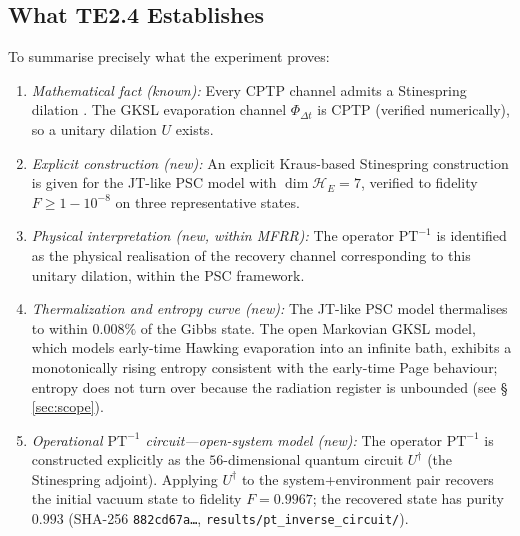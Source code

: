 \documentclass[11pt,twocolumn]{article}
\theoremstyle{remark}
\begin{document}
\subsection{What TE2.4 Establishes}

To summarise precisely what the experiment proves:

\begin{enumerate}[label=\arabic*.]
\item \textit{Mathematical fact (known):} Every CPTP channel admits a
Stinespring dilation \cite{Stinespring1955}. The GKSL evaporation
channel $\Phi_{\Delta t}$ is CPTP (verified numerically), so a unitary
dilation $U$ exists.

\item \textit{Explicit construction (new):} An explicit Kraus-based
Stinespring construction is given for the JT-like PSC model with
$\dim\mathcal{H}_E = 7$, verified to fidelity $F\geq 1-10^{-8}$ on
three representative states.

\item \textit{Physical interpretation (new, within MFRR):} The operator
$\mathrm{PT}^{-1}$ is identified as the physical realisation of the
recovery channel corresponding to this unitary dilation, within the PSC
framework.

\item \textit{Thermalization and entropy curve (new):} The JT-like PSC
model thermalises to within $0.008\%$ of the Gibbs state. The open
Markovian GKSL model, which models early-time Hawking evaporation into
an infinite bath, exhibits a monotonically rising entropy consistent with
the early-time Page behaviour; entropy does not turn over because the
radiation register is unbounded (see \S\,\ref{sec:scope}).

\item \textit{Operational $\mathrm{PT}^{-1}$ circuit---open-system
model (new):} The operator $\mathrm{PT}^{-1}$ is constructed explicitly
as the $56$-dimensional quantum circuit $U^\dagger$ (the Stinespring
adjoint). Applying $U^\dagger$ to the system+environment pair recovers
the initial vacuum state to fidelity $F = 0.9967$; the recovered state
has purity $0.993$ (SHA-256 \texttt{882cd67a\ldots},
\texttt{results/pt\_inverse\_circuit/}).


\end{enumerate}
\end{document}
